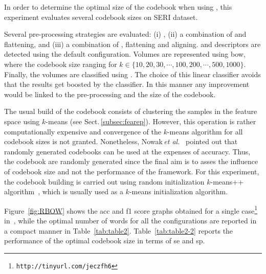 In order to determine the optimal size of the codebook when using \bow, this experiment evaluates several codebook sizes on SERI dataset.

Several pre-processing strategies are evaluated: (i) \nlm, (ii) a combination of \nlm and flattening, and (iii) a combination of \nlm, flattening and aligning.
\lbp and \lbptop descriptors are detected using the default configuration.
Volumes are represented using \ac{bow}, where the codebook size ranging for $k \in \{10, 20, 30, \cdots, 100, 200, \cdots, 500, 1000\}$.
Finally, the volumes are classified using \lr.
The choice of this linear classifier avoids that the results get boosted by the classifier. In this manner any improvement would be linked to the pre-processing and the size of the codebook.




The usual build of the codebook consists of clustering the samples in
the feature space using $k$-means (see Sect.\,\ref{subsec:fearep}).
However, this operation is rather computationally expensive and convergence of the $k$-means algorithm for all codebook sizes is not granted.
Nonetheless, Nowak\,\textit{et al.}~\cite{nowak2006sampling} pointed out that randomly generated codebooks can be used at the expenses of accuracy.
Thus, the codebook are randomly generated since the final aim is to asses the influence of codebook size and not the performance of the framework.
For this experiment, the codebook building is carried out using random initialization $k$-means++ algorithm~\cite{arthur2007k}, which is usually used as a $k$-means initialization algorithm.

Figure~\ref{fig:RBOW} shows the \ac{acc} and \ac{f1} score graphs obtained for a single case\footnote{\texttt{http://tinyurl.com/jeczfh6}}
 in~\cite{Lemaitre2015}, while the optimal number of words for all the configurations are reported in a compact manner in Table~\ref{tab:table2}.
Table~\ref{tab:table2-2} reports the performance of the optimal codebook size in terms of \ac{se} and \ac{sp}.

